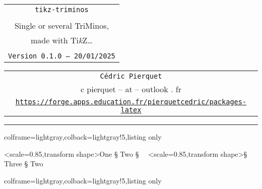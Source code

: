 \documentclass[11pt,a4paper]{ltxdoc}
\def\TPversion{0.1.0}
\def\TPdate{20/01/2025}
\begin{document}
\thispagestyle{empty}

\begin{center}
	\begin{minipage}{0.88\linewidth}
		\begin{tcolorbox}[colframe=yellow,colback=yellow!15]
			\begin{center}
				\renewcommand{\arraystretch}{1.25}%
				\begin{tabular}{c}
					{\Huge \texttt{tikz-triminos}}\\
					\\
					{\LARGE Single or several TriMinos,} \\
					{\LARGE made with Ti\textit{k}Z\ldots} \\
					\\
					{\small \texttt{Version \TPversion{} -- \TPdate}}
				\end{tabular}
			\end{center}
		\end{tcolorbox}
	\end{minipage}
\end{center}

\begin{center}
	\begin{tabular}{c}
		\texttt{Cédric Pierquet}\\
		{\ttfamily c pierquet -- at -- outlook . fr}\\
		\texttt{\url{https://forge.apps.education.fr/pierquetcedric/packages-latex}} \\
	\end{tabular}
\end{center}

\hrule

\vfill

\begin{tcblisting}{colframe=lightgray,colback=lightgray!5,listing only}
~~
\end{tcblisting}

\begin{tcolorbox}[colframe=lightgray,colback=lightgray!5]
\hfill\tkztriminos<scale=0.85,transform shape>{One § Two § \faHatWizard}~~\tkztriminos<scale=0.85,transform shape>{\faHatWizard § Three § Two}\hfill~
\end{tcolorbox}


\begin{tcblisting}{colframe=lightgray,colback=lightgray!5,listing only}
\end{tcblisting}
\end{document}
